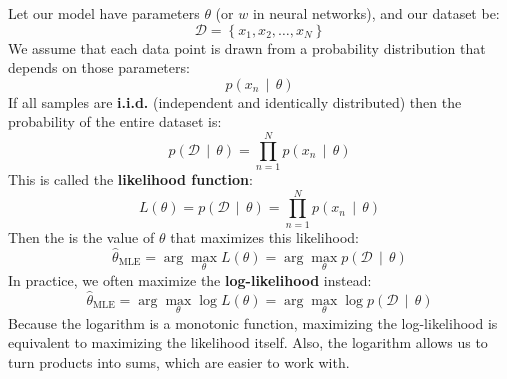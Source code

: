 \highspace
\begin{definitionbox}
    Let our model have parameters $\theta$ (or $w$ in neural networks), and our dataset be:
    \begin{equation*}
        \mathcal{D} = \left\{ x_{1}, x_{2}, \ldots, x_{N} \right\}
    \end{equation*}
    We assume that each data point is drawn from a probability distribution that depends on those parameters:
    \begin{equation*}
        p\left(x_{n} \, \mid \, \theta\right)
    \end{equation*}
    If all samples are \textbf{i.i.d.} (independent and identically distributed) then the probability of the entire dataset is:
    \begin{equation*}
        p\left(\mathcal{D} \, \mid \, \theta\right) = \displaystyle\prod_{n=1}^{N} p\left(x_{n} \, \mid \, \theta\right)
    \end{equation*}
    This is called the \textbf{likelihood function}:
    \begin{equation}
        L\left(\theta\right) = p\left(\mathcal{D} \, \mid \, \theta\right) = \displaystyle\prod_{n=1}^{N} p\left(x_{n} \, \mid \, \theta\right)
    \end{equation}
    Then the  is the value of $\theta$ that maximizes this likelihood:
    \begin{equation}
        \hat{\theta}_{\text{MLE}} = \arg\max_{\theta} L\left(\theta\right) = \arg\max_{\theta} p\left(\mathcal{D} \, \mid \, \theta\right)
    \end{equation}
    In practice, we often maximize the \textbf{log-likelihood} instead:
    \begin{equation}
        \hat{\theta}_{\text{MLE}} = \arg\max_{\theta} \log L\left(\theta\right) = \arg\max_{\theta} \log p\left(\mathcal{D} \, \mid \, \theta\right)
    \end{equation}
    Because the logarithm is a monotonic function, maximizing the log-likelihood is equivalent to maximizing the likelihood itself. Also, the logarithm allows us to turn products into sums, which are easier to work with.
\end{definitionbox}

